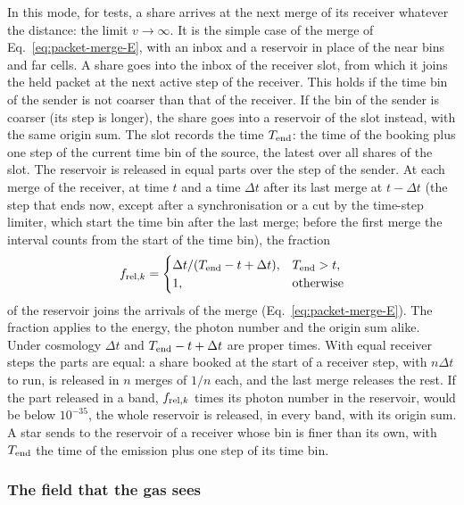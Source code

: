 In this mode, for tests, a share arrives at the next merge of its receiver
whatever the distance: the limit $v\to\infty$. It is the simple case of the
merge of Eq.~\eqref{eq:packet-merge-E}, with an inbox and a reservoir in place
of the near bins and far cells. A share goes into the inbox of the receiver slot, from which it joins the held
packet at the next active step of the receiver. This holds if the time bin of
the sender is not coarser than that of the receiver. If the bin of the sender
is coarser (its step is longer), the share goes into a reservoir of the slot
instead, with the same origin sum. The slot records the time $T_{\rm end}$:
the time of the booking plus one step of the current time bin of the source,
the latest over all shares of the slot. The reservoir is released in equal
parts over the step of the sender. At each merge of the receiver, at time $t$
and a time $\Delta t$ after its last merge at $t-\Delta t$ (the step that ends
now, except after a synchronisation or a cut by the time-step limiter, which
start the time bin after the last merge; before the first merge the interval
counts from the start of the time bin), the fraction
\begin{equation}
  f_{{\rm rel},k} = \begin{cases}
    \Delta t/(T_{\rm end}-t+\Delta t), & T_{\rm end}>t,\\
    1, & \text{otherwise}
  \end{cases}
  \label{eq:packet-release}
\end{equation}
of the reservoir joins the arrivals of the merge
(Eq.~\eqref{eq:packet-merge-E}). The fraction applies to the energy, the photon
number and the origin sum alike. Under cosmology $\Delta t$ and
$T_{\rm end}-t+\Delta t$ are proper times. With equal receiver steps the parts are equal: a share booked at
the start of a receiver step, with $n\Delta t$ to run, is released in $n$
merges of $1/n$ each, and the last merge releases the rest. If the part
released in a band, $f_{{\rm rel},k}$ times its photon number in the
reservoir, would be below $10^{-35}$, the whole reservoir is released, in every
band, with its origin sum. A star sends to the reservoir of a receiver whose
bin is finer than its own, with $T_{\rm end}$ the time of the emission plus
one step of its time bin.

\subsubsection{The field that the gas sees}
\label{sec:packet-field}

